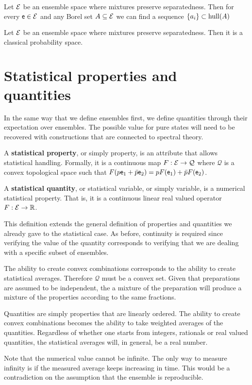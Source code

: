 \begin{prop}
	Let $\mathcal{E}$ be an ensemble space where mixtures preserve separatedness. Then for every $\mathsf{e} \in \mathcal{E}$ and any Borel set $A \subseteq \mathcal{E}$ we can find a sequence $\{a_i\} \subset \mathrm{hull}(A) $
\end{prop}

\begin{conj}
	Let $\mathcal{E}$ be an ensemble space where mixtures preserve separatedness. Then it is a classical probability space.
\end{conj}




\section{Statistical properties and quantities}

In the same way that we define ensembles first, we define quantities through their expectation over ensembles. The possible value for pure states will need to be recovered with constructions that are connected to spectral theory.

\begin{defn}
	A \textbf{statistical property}, or simply property, is an attribute that allows statistical handling. Formally, it is a continuous map $F : \mathcal{E} \to \mathcal{Q}$ where $\mathcal{Q}$ is a convex topological space such that $F(p \mathsf{e}_1 + \bar{p} \mathsf{e}_2) = p F(\mathsf{e}_1) + \bar{p} F(\mathsf{e}_2)$.
	
	A \textbf{statistical quantity}, or statistical variable, or simply variable, is a numerical statistical property. That is, it is a continuous linear real valued operator $F : \mathcal{E} \to \mathbb{R}$.
\end{defn}

\begin{justification}
	This definition extends the general definition of properties and quantities we already gave to the statistical case. As before, continuity is required since verifying the value of the quantity corresponds to verifying that we are dealing with a specific subset of ensembles.
	
	The ability to create convex combinations corresponds to the ability to create statistical averages. Therefore $\mathcal{Q}$ must be a convex set. Given that preparations are assumed to be independent, the a mixture of the preparation will produce a mixture of the properties according to the same fractions. 
	
	Quantities are simply properties that are linearly ordered. The ability to create convex combinations becomes the ability to take weighted averages of the quantities. Regardless of whether one starts from integers, rationals or real valued quantities, the statistical averages will, in general, be a real number.
	
	Note that the numerical value cannot be infinite. The only way to measure infinity is if the measured average keeps increasing in time. This would be a contradiction on the assumption that the ensemble is reproducible.
\end{justification}

